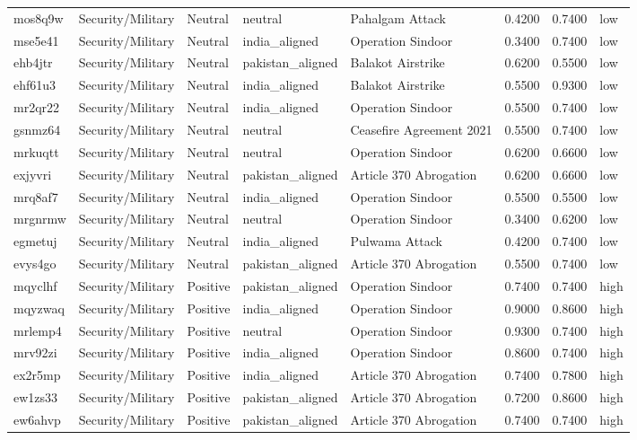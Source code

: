 \begin{longtable}{lllllrrl}
mos8q9w & Security/Military & Neutral & neutral & Pahalgam Attack & 0.4200 & 0.7400 & low \\
mse5e41 & Security/Military & Neutral & india\_aligned & Operation Sindoor & 0.3400 & 0.7400 & low \\
ehb4jtr & Security/Military & Neutral & pakistan\_aligned & Balakot Airstrike & 0.6200 & 0.5500 & low \\
ehf61u3 & Security/Military & Neutral & india\_aligned & Balakot Airstrike & 0.5500 & 0.9300 & low \\
mr2qr22 & Security/Military & Neutral & india\_aligned & Operation Sindoor & 0.5500 & 0.7400 & low \\
gsnmz64 & Security/Military & Neutral & neutral & Ceasefire Agreement 2021 & 0.5500 & 0.7400 & low \\
mrkuqtt & Security/Military & Neutral & neutral & Operation Sindoor & 0.6200 & 0.6600 & low \\
exjyvri & Security/Military & Neutral & pakistan\_aligned & Article 370 Abrogation & 0.6200 & 0.6600 & low \\
mrq8af7 & Security/Military & Neutral & india\_aligned & Operation Sindoor & 0.5500 & 0.5500 & low \\
mrgnrmw & Security/Military & Neutral & neutral & Operation Sindoor & 0.3400 & 0.6200 & low \\
egmetuj & Security/Military & Neutral & india\_aligned & Pulwama Attack & 0.4200 & 0.7400 & low \\
evys4go & Security/Military & Neutral & pakistan\_aligned & Article 370 Abrogation & 0.5500 & 0.7400 & low \\
mqyclhf & Security/Military & Positive & pakistan\_aligned & Operation Sindoor & 0.7400 & 0.7400 & high \\
mqyzwaq & Security/Military & Positive & india\_aligned & Operation Sindoor & 0.9000 & 0.8600 & high \\
mrlemp4 & Security/Military & Positive & neutral & Operation Sindoor & 0.9300 & 0.7400 & high \\
mrv92zi & Security/Military & Positive & india\_aligned & Operation Sindoor & 0.8600 & 0.7400 & high \\
ex2r5mp & Security/Military & Positive & india\_aligned & Article 370 Abrogation & 0.7400 & 0.7800 & high \\
ew1zs33 & Security/Military & Positive & pakistan\_aligned & Article 370 Abrogation & 0.7200 & 0.8600 & high \\
ew6ahvp & Security/Military & Positive & pakistan\_aligned & Article 370 Abrogation & 0.7400 & 0.7400 & high \\

\end{longtable}
